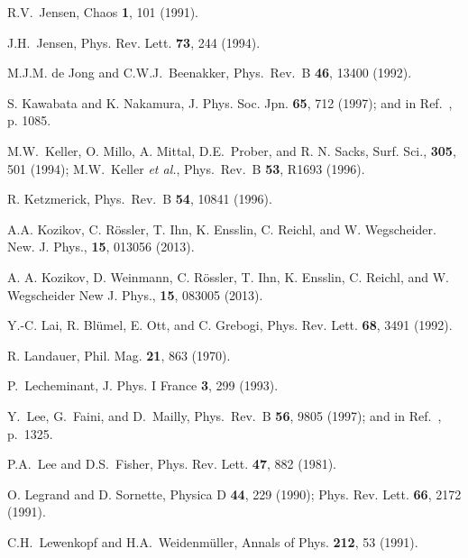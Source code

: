 \documentclass[a4paper,10pt]{article}
\begin{document}
\begin{thebibliography}{Cucc~02b}
R.V.~Jensen, Chaos {\bf 1}, 101 (1991).

J.H.~Jensen, Phys. Rev. Lett. {\bf 73}, 244 (1994).

M.J.M. de Jong and C.W.J.~Beenakker,
Phys.\ Rev.\ B {\bf 46}, 13400 (1992).

S. Kawabata and K. Nakamura,
J. Phys. Soc. Jpn. {\bf 65}, 712 (1997); and in Ref.~\cite{csf}, p. 1085.

M.W.~Keller, O. Millo, A. Mittal, D.E.~Prober, and R. N. Sacks,
Surf. Sci., {\bf 305}, 501 (1994); M.W.~Keller {\em et al.}, 
Phys.\ Rev.\ B {\bf 53}, R1693 (1996).

 R. Ketzmerick, Phys.\ Rev.\ B {\bf 54}, 10841 (1996).

A.A. Kozikov, C. R\"ossler, T. Ihn, K. Ensslin, C. Reichl, and W. Wegscheider. 
New. J. Phys., {\bf 15}, 013056 (2013). 

A. A. Kozikov, D. Weinmann, C. R\"ossler, T. Ihn, K. Ensslin, C. Reichl, and W. Wegscheider
New J. Phys., {\bf 15}, 083005 (2013).

Y.-C. Lai, R. Bl\"umel, E. Ott, and C. Grebogi,
Phys. Rev. Lett. {\bf 68}, 3491 (1992).

R. Landauer, Phil. Mag. {\bf 21}, 863 (1970).

P.~Lecheminant, J. Phys. I France {\bf 3}, 299 (1993). 

 Y.\ Lee, G.\ Faini, and D.\ Mailly, Phys.\ Rev.\ B {\bf 56}, 9805 (1997); and in Ref.~\cite{csf}, p.~1325.

P.A.~Lee and D.S.~Fisher, Phys. Rev. Lett. {\bf 47}, 882 (1981). 

O. Legrand and D. Sornette, Physica D {\bf 44}, 229 (1990);
Phys. Rev. Lett. {\bf 66}, 2172 (1991).

C.H.~Lewenkopf and H.A.~Weidenm\"uller, Annals of Phys. {\bf 212}, 53 (1991).


\end{thebibliography}
\end{document}
